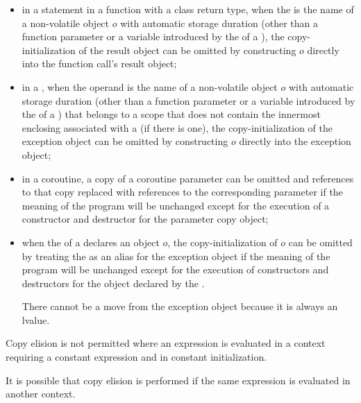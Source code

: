 \begin{itemize}
\item in a  statement in
a function with a class return type,
when the  is the name of a non-volatile
object $o$ with automatic storage duration (other than a function parameter or a variable
introduced by the  of a
),
the copy-initialization of the result object can be
omitted by constructing $o$ directly
into the function call's result object;

\item in a , when the operand
is the name of a non-volatile object $o$ with automatic storage duration
(other than a function parameter or
a variable introduced by
the  of a )
that belongs to a scope that does not contain
the innermost enclosing 
associated with a  (if there is one),
the copy-initialization of the exception object can be omitted by
constructing $o$ directly into the exception object;

\item in a coroutine, a copy of a coroutine parameter
can be omitted and references to that copy replaced with references to the
corresponding parameter if the meaning of the program will be unchanged except for
the execution of a constructor and destructor for the parameter copy object;

\item when the  of a
 declares an object $o$,
the copy-initialization of $o$ can be omitted by treating
the  as an alias for the exception
object if the meaning of the program will be unchanged except for the execution
of constructors and destructors for the object declared by the
.
\begin{note}
There cannot be a move from the exception object because it is
always an lvalue.
\end{note}
\end{itemize}
Copy elision is not permitted
where an expression is evaluated in a context
requiring a constant expression
and in constant initialization.
\begin{note}
It is possible that copy elision is performed
if the same expression
is evaluated in another context.
\end{note}

